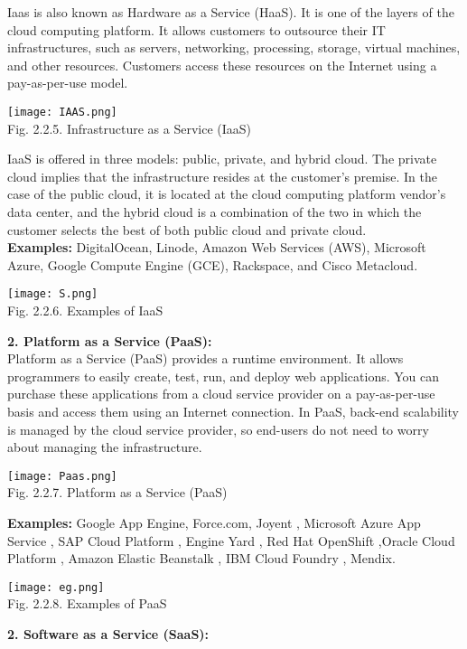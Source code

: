\documentclass[12pt,a4paper]{article}
\begin{document}
Iaas is also known as Hardware as a Service (HaaS). It is one of the layers of the cloud computing platform. It allows customers to outsource their IT infrastructures, such as servers, networking, processing, storage, virtual machines, and other resources. Customers access these resources on the Internet using a pay-as-per-use model.\\
\begin{center}
\texttt{[image: IAAS.png]}\\
Fig. 2.2.5. Infrastructure as a Service (IaaS)\\
\end{center}
IaaS is offered in three models: public, private, and hybrid cloud. The private cloud implies that the infrastructure resides at the customer's premise. In the case of the public cloud, it is located at the cloud computing platform vendor's data center, and the hybrid cloud is a combination of the two in which the customer selects the best of both public cloud and private cloud.\\

\textbf{Examples:} DigitalOcean, Linode, Amazon Web Services (AWS), Microsoft Azure, Google Compute Engine (GCE), Rackspace, and Cisco Metacloud.
\begin{center}
\texttt{[image: S.png]}\\
Fig. 2.2.6. Examples of IaaS\\
\end{center}
\textbf{2. Platform as a Service (PaaS):}\\

Platform as a Service (PaaS) provides a runtime environment. It allows programmers to easily create, test, run, and deploy web applications. You can purchase these applications from a cloud service provider on a pay-as-per-use basis and access them using an Internet connection. In PaaS, back-end scalability is managed by the cloud service provider, so end-users do not need to worry about managing the infrastructure.\\
\begin{center}
\texttt{[image: Paas.png]}\\
Fig. 2.2.7. Platform as a Service (PaaS)\\
\end{center}
\textbf{Examples:} Google App Engine, Force.com, Joyent , Microsoft Azure App Service , SAP Cloud Platform , Engine Yard , Red Hat OpenShift ,Oracle Cloud Platform , Amazon Elastic Beanstalk , IBM Cloud Foundry , Mendix.\\
\begin{center}
\texttt{[image: eg.png]}\\
Fig. 2.2.8. Examples of PaaS\\
\end{center}
\textbf{2. Software as a Service (SaaS):}\\
\end{document}
